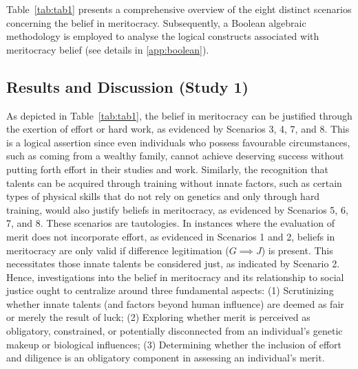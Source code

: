 Table~\ref{tab:tab1} presents a comprehensive overview of the eight distinct scenarios concerning the belief in meritocracy. Subsequently, a Boolean algebraic methodology is employed to analyse the logical constructs associated with meritocracy belief (see details in \ref{app:boolean}).

\begin{table}

\end{table}

\subsection{Results and Discussion (Study 1)}

As depicted in Table~\ref{tab:tab1}, the belief in meritocracy can be justified through the exertion of effort or hard work, as evidenced by Scenarios 3, 4, 7, and 8. This is a logical assertion since even individuals who possess favourable circumstances, such as coming from a wealthy family, cannot achieve deserving success without putting forth effort in their studies and work. Similarly, the recognition that talents can be acquired through training without innate factors, such as certain types of physical skills that do not rely on genetics and only through hard training, would also justify beliefs in meritocracy, as evidenced by Scenarios 5, 6, 7, and 8. These scenarios are tautologies. In instances where the evaluation of merit does not incorporate effort, as evidenced in Scenarios 1 and 2, beliefs in meritocracy are only valid if difference legitimation ($G \implies J$) is present. This necessitates those innate talents be considered just, as indicated by Scenario 2. Hence, investigations into the belief in meritocracy and its relationship to social justice ought to centralize around three fundamental aspects: (1) Scrutinizing whether innate talents (and factors beyond human influence) are deemed as fair or merely the result of luck; (2) Exploring whether merit is perceived as obligatory, constrained, or potentially disconnected from an individual's genetic makeup or biological influences; (3) Determining whether the inclusion of effort and diligence is an obligatory component in assessing an individual's merit.

